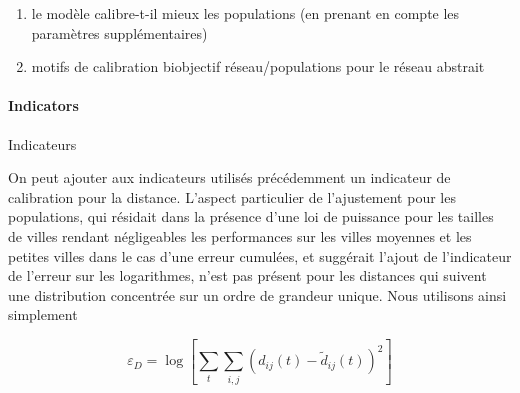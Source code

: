 \begin{enumerate}
\item le modèle calibre-t-il mieux les populations (en prenant en compte les paramètres supplémentaires)
\item motifs de calibration biobjectif réseau/populations pour le réseau abstrait
\end{enumerate}



\paragraph{Indicators}{Indicateurs}

On peut ajouter aux indicateurs utilisés précédemment un indicateur de calibration pour la distance. L'aspect particulier de l'ajustement pour les populations, qui résidait dans la présence d'une loi de puissance pour les tailles de villes rendant négligeables les performances sur les villes moyennes et les petites villes dans le cas d'une erreur cumulées, et suggérait l'ajout de l'indicateur de l'erreur sur les logarithmes, n'est pas présent pour les distances qui suivent une distribution concentrée sur un ordre de grandeur unique. Nous utilisons ainsi simplement

\[
\varepsilon_D = \log \left[ \sum_t \sum_{i,j} \left(d_{ij}(t) - \tilde{d}_{ij}(t)\right)^2\right]
\]











